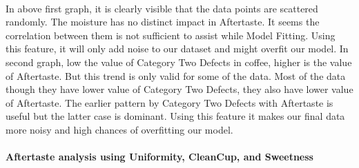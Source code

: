\documentclass[11pt]{article}
\begin{document}
    \begin{center}
    \end{center}
    { \hspace*{\fill} \\}
    
    In above first graph, it is clearly visible that the data points are
scattered randomly. The moisture has no distinct impact in Aftertaste.
It seems the correlation between them is not sufficient to assist while
Model Fitting. Using this feature, it will only add noise to our dataset
and might overfit our model. In second graph, low the value of Category
Two Defects in coffee, higher is the value of Aftertaste. But this trend
is only valid for some of the data. Most of the data though they have
lower value of Category Two Defects, they also have lower value of
Aftertaste. The earlier pattern by Category Two Defects with Aftertaste
is useful but the latter case is dominant. Using this feature it makes
our final data more noisy and high chances of overfitting our model.

    \hypertarget{aftertaste-analysis-using-uniformity-cleancup-and-sweetness}{%
\paragraph{Aftertaste analysis using Uniformity, CleanCup, and
Sweetness}\label{aftertaste-analysis-using-uniformity-cleancup-and-sweetness}}
\end{document}
